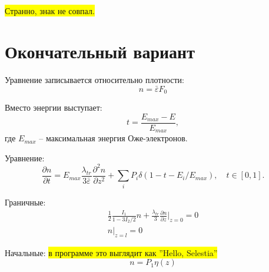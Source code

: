 \documentclass[a4paper,12pt]{article} %
\newcommand{\dff}[2]{\frac{\partial #1}{\partial #2}}
\newcommand{\dfn}[3]{\frac{\partial^#1 #2}{\partial #3^#1}}
\newcommand{\eps}{\varepsilon}
\begin{document}
\colorbox{yellow}{Странно, знак не совпал.}

\clearpage
\section{Окончательный вариант}

Уравнение записывается относительно плотности:
\begin{equation}
	n = \bar{\eps} F_0
\end{equation}

Вместо энергии выступает:
\begin{equation}
	t = \frac{E_{max} - E}{E_{max}},
\end{equation}
где $E_{max}$ -- максимальная энергия Оже-электронов.

Уравнение:
\begin{equation}
	\dff{n}{t} = E_{max}\frac{\lambda_{tr}}{3\bar{\eps}}\dfn{2}{n}{z} + \sum_{i} P_i\delta(1 - t - E_i/E_{max}), \quad t\in[0, 1].
\end{equation}

Граничные:
\begin{gather}
	\frac{1}{2} \frac{I_1}{1 - 3 I_2/2} n + \frac{\lambda_{tr}}{3} \dff{n}{z} \Bigg|_{z = 0} = 0 \\
	n\Bigg|_{z = l} = 0
\end{gather}

Начальные: \colorbox{yellow}{в программе это выглядит как ''Hello, Selestia''}
\begin{equation}
	n = P_1 \eta (z)
\end{equation}
\end{document}
